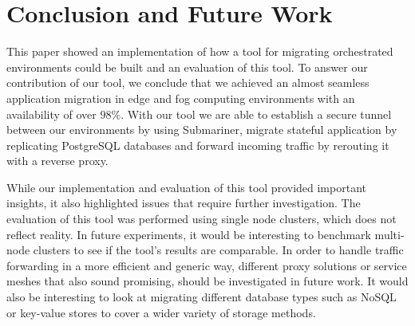 %
\section{Conclusion and Future Work}
\label{sec:conclusion}
%
This paper showed an implementation of how a tool for migrating orchestrated environments could be built and an evaluation of this tool. 
To answer our contribution of our tool, we conclude that we achieved an almost seamless application migration in edge and fog computing environments with an availability of over $98\%$.
With our tool we are able to establish a secure tunnel between our environments by using Submariner, migrate stateful application by replicating PostgreSQL databases and forward incoming traffic by rerouting it with a reverse proxy.

While our implementation and evaluation of this tool provided important insights, it also highlighted issues that require further investigation.
The evaluation of this tool was performed using single node clusters, which does not reflect reality.
In future experiments, it would be interesting to benchmark multi-node clusters to see if the tool's results are comparable.
In order to handle traffic forwarding in a more efficient and generic way, different proxy solutions or service meshes that also sound promising, should be investigated in future work.
It would also be interesting to look at migrating different database types such as NoSQL or key-value stores to cover a wider variety of storage methods.